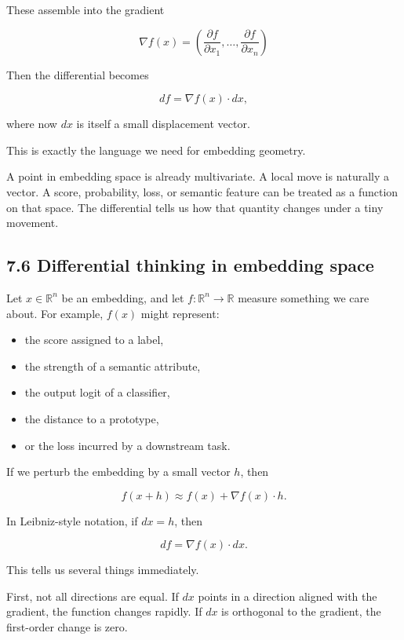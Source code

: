 These assemble into the gradient

\[
\nabla f(x)=\left(\frac{\partial f}{\partial x_1},\dots,\frac{\partial f}{\partial x_n}\right)
\]

Then the differential becomes

\[
df = \nabla f(x)\cdot dx,
\]

where now \(dx\) is itself a small displacement vector.

This is exactly the language we need for embedding geometry.

A point in embedding space is already multivariate. A local move is
naturally a vector. A score, probability, loss, or semantic feature can
be treated as a function on that space. The differential tells us how
that quantity changes under a tiny movement.

\hypertarget{differential-thinking-in-embedding-space}{%
\subsection{7.6 Differential thinking in embedding
space}\label{differential-thinking-in-embedding-space}}

Let \(x \in \mathbb{R}^n\) be an embedding, and let
\(f:\mathbb{R}^n\to\mathbb{R}\) measure something we care about. For
example, \(f(x)\) might represent:

\begin{itemize}
\tightlist
\item
  the score assigned to a label,
\item
  the strength of a semantic attribute,
\item
  the output logit of a classifier,
\item
  the distance to a prototype,
\item
  or the loss incurred by a downstream task.
\end{itemize}

If we perturb the embedding by a small vector \(h\), then

\[
f(x+h) \approx f(x) + \nabla f(x)\cdot h.
\]

In Leibniz-style notation, if \(dx=h\), then

\[ 
df = \nabla f(x)\cdot dx.
\]

This tells us several things immediately.

First, not all directions are equal. If \(dx\) points in a direction
aligned with the gradient, the function changes rapidly. If \(dx\) is
orthogonal to the gradient, the first-order change is zero.

